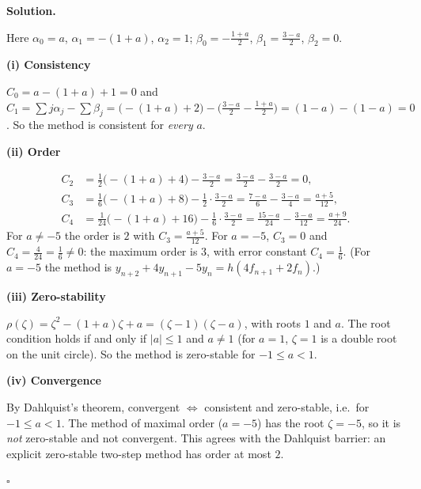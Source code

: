 \documentclass[11pt,a4paper]{article}
\newenvironment{solution}
  {\par\noindent\textbf{Solution.}\par\nobreak}
  {\par\nobreak\noindent\hfill\(\square\)\par}
\newcommand{\step}[1]{\par\addvspace{0.5em}\noindent\textbf{#1}\par\nobreak}
\begin{document}
\begin{solution}
Here \(\alpha_0=a\), \(\alpha_1=-(1+a)\), \(\alpha_2=1\);
\(\beta_0=-\frac{1+a}2\), \(\beta_1=\frac{3-a}2\), \(\beta_2=0\).

\step{(i) Consistency}
\(C_0=a-(1+a)+1=0\) and
\(C_1=\sum j\alpha_j-\sum\beta_j=\bigl(-(1+a)+2\bigr)-\bigl(\frac{3-a}2-\frac{1+a}2\bigr)
=(1-a)-(1-a)=0\).  So the method is consistent for \emph{every} \(a\).

\step{(ii) Order}
\begin{align*}
  C_2&=\tfrac12\bigl(-(1+a)+4\bigr)-\tfrac{3-a}2=\tfrac{3-a}2-\tfrac{3-a}2=0,\\
  C_3&=\tfrac16\bigl(-(1+a)+8\bigr)-\tfrac12\cdot\tfrac{3-a}2
      =\tfrac{7-a}6-\tfrac{3-a}4=\tfrac{a+5}{12},\\
  C_4&=\tfrac1{24}\bigl(-(1+a)+16\bigr)-\tfrac16\cdot\tfrac{3-a}2
      =\tfrac{15-a}{24}-\tfrac{3-a}{12}=\tfrac{a+9}{24}.
\end{align*}
For \(a\ne-5\) the order is \(2\) with \(C_3=\frac{a+5}{12}\).  For
\(a=-5\), \(C_3=0\) and \(C_4=\frac4{24}=\frac16\ne0\): the maximum
order is \(3\), with error constant \(C_4=\frac16\).  (For \(a=-5\) the
method is \(y_{n+2}+4y_{n+1}-5y_n=h(4f_{n+1}+2f_n)\).)

\step{(iii) Zero-stability}
\(\rho(\zeta)=\zeta^2-(1+a)\zeta+a=(\zeta-1)(\zeta-a)\), with roots
\(1\) and \(a\).  The root condition holds if and only if \(|a|\le1\)
and \(a\ne1\) (for \(a=1\), \(\zeta=1\) is a double root on the unit
circle).  So the method is zero-stable for \(-1\le a<1\).

\step{(iv) Convergence}
By Dahlquist's theorem, convergent \(\iff\) consistent and
zero-stable, i.e.\ for \(-1\le a<1\).  The method of maximal order
(\(a=-5\)) has the root \(\zeta=-5\), so it is \emph{not} zero-stable
and not convergent.  This agrees with the Dahlquist barrier: an
explicit zero-stable two-step method has order at most \(2\).
\end{solution}
\end{document}
